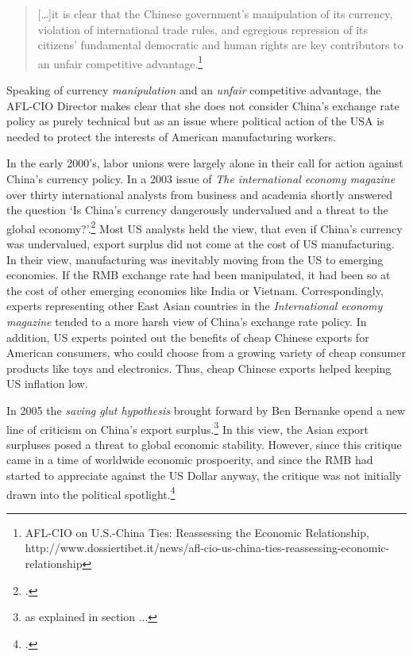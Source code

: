 \begin{quote}
[\dots]it is clear that the Chinese government’s manipulation of its 
currency, violation of international trade rules, and egregious 
repression of its citizens’ fundamental democratic and human rights are 
key contributors to an unfair competitive advantage.\footnote{AFL-CIO on 
U.S.-China Ties: Reassessing the Economic Relationship, 
http://www.dossiertibet.it/news/afl-cio-us-china-ties-reassessing-economic-relationship}
\end{quote}

Speaking of currency \emph{manipulation} and an \emph{unfair} 
competitive advantage, the AFL-CIO Director makes clear that she does 
not consider China's exchange rate policy as purely technical but as an 
issue where political action of the USA is needed to protect the 
interests of American manufacturing workers.

In the early 2000's, labor unions were largely alone in their call for 
action against China's currency policy. In a 2003 issue of \emph{The 
international economy magazine} over thirty international analysts from 
business and academia shortly answered the question `Is China's currency 
dangerously undervalued and a threat to the global 
economy?'.\footnote{\cite{IEM2003}.}
Most US analysts held the view, that even if China's currency was 
undervalued, export surplus did not come at the cost of US 
manufacturing. In their view, manufacturing was inevitably moving from 
the US to emerging economies. If the RMB exchange rate had been 
manipulated, it had been so at the cost of other emerging economies like 
India or Vietnam. Correspondingly, experts representing other East Asian 
countries in the \emph{International economy magazine} tended to a more 
harsh view of China's exchange rate policy. In addition, US experts 
pointed out the benefits of cheap Chinese exports for American 
consumers, who could choose from a growing variety of cheap consumer 
products like toys and electronics. Thus, cheap Chinese exports helped 
keeping US inflation low.

In 2005 the \emph{saving glut hypothesis} brought forward by Ben 
Bernanke opend a new line of criticism on China's export 
surplus.\footnote{as explained in section ...} %
In this view, the Asian export surpluses posed a threat to global 
economic stability. However, since this critique came in a time of 
worldwide economic prospoerity, and since the RMB had started to 
appreciate against the US Dollar anyway, the critique was not initially 
drawn into the political spotlight.\footnote{\cite[p.16]{Levy2010}.}

